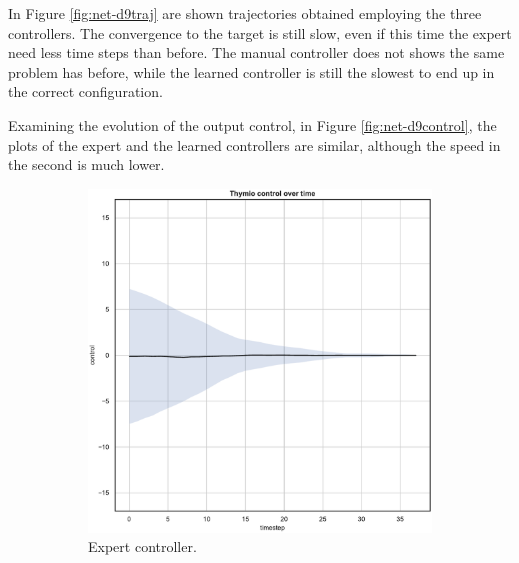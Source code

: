 In Figure \ref{fig:net-d9traj} are shown trajectories obtained employing the three 
controllers. The convergence to the target is still slow, even if this time the expert 
need less time steps than before. 
The manual controller does not shows the same problem has before, while the 
learned controller is still the slowest to end up in the correct configuration.



Examining the evolution of the output control, in Figure \ref{fig:net-d9control}, 
the plots of the expert and the learned controllers are similar, although the speed 
in the second is much lower.
\begin{figure}[!htb]
	\centering
	\begin{subfigure}[h]{0.3\textwidth}
		\centering
		\includegraphics[width=\textwidth]{contents/images/net-d9/control-overtime-omniscient}%
		\caption{Expert controller.}
	\end{subfigure}
	\hfill
	\begin{subfigure}[h]{0.3\textwidth}
		\centering

\end{subfigure}
\end{figure}
